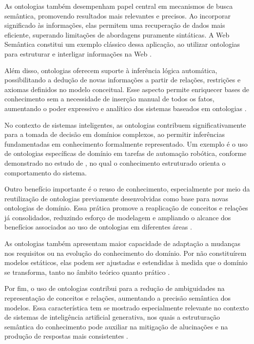 As ontologias também desempenham papel central em mecanismos de busca semântica, promovendo resultados mais relevantes e precisos. Ao incorporar significado às informações, elas permitem uma recuperação de dados mais eficiente, superando limitações de abordagens puramente sintáticas. A Web Semântica constitui um exemplo clássico dessa aplicação, ao utilizar ontologias para estruturar e interligar informações na Web \cite{isotani2015ontologias}.

Além disso, ontologias oferecem suporte à inferência lógica automática, possibilitando a dedução de novas informações a partir de relações, restrições e axiomas definidos no modelo conceitual. Esse aspecto permite enriquecer bases de conhecimento sem a necessidade de inserção manual de todos os fatos, aumentando o poder expressivo e analítico dos sistemas baseados em ontologias \cite{mario2020handling}.

No contexto de sistemas inteligentes, as ontologias contribuem significativamente para a tomada de decisão em domínios complexos, ao permitir inferências fundamentadas em conhecimento formalmente representado. Um exemplo é o uso de ontologias específicas de domínio em tarefas de automação robótica, conforme demonstrado no estudo de \citeauthor{kattepur2018knowledge}, no qual o conhecimento estruturado orienta o comportamento do sistema.

Outro benefício importante é o reuso de conhecimento, especialmente por meio da reutilização de ontologias previamente desenvolvidas como base para novas ontologias de domínio. Essa prática promove a reaplicação de conceitos e relações já consolidados, reduzindo esforço de modelagem e ampliando o alcance dos benefícios associados ao uso de ontologias em diferentes áreas \cite{corcho2005building}.

As ontologias também apresentam maior capacidade de adaptação a mudanças nos requisitos ou na evolução do conhecimento do domínio. Por não constituírem modelos estáticos, elas podem ser ajustadas e estendidas à medida que o domínio se transforma, tanto no âmbito teórico quanto prático \cite{kondylakis2013ontology}.

Por fim, o uso de ontologias contribui para a redução de ambiguidades na representação de conceitos e relações, aumentando a precisão semântica dos modelos. Essa característica tem se mostrado especialmente relevante no contexto de sistemas de inteligência artificial generativa, nos quais a estruturação semântica do conhecimento pode auxiliar na mitigação de alucinações e na produção de respostas mais consistentes \cite{caufield2024structured}.
